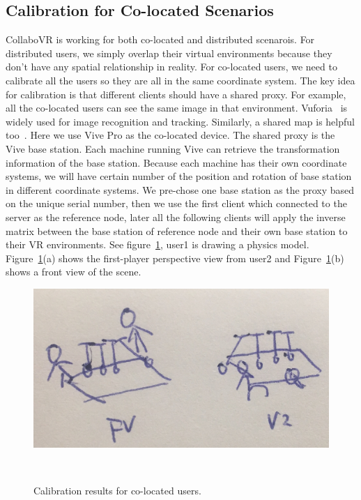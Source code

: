 \documentclass{sigchi}
\begin{document}
\subsection{Calibration for Co-located Scenarios}
CollaboVR is working for both co-located and distributed scenarois. For distributed users, we simply overlap their virtual environments because they don't have any spatial relationship in reality. For co-located users, we need to calibrate all the users so they are all in the same coordinate system. The key idea for calibration is that different clients should have a shared proxy. For example, all the co-located users can see the same image in that environment. Vuforia~\cite{Vuforia} is widely used for image recognition and tracking. Similarly, a shared map is helpful too~\cite{Hololens}. Here we use Vive Pro as the co-located device. The shared proxy is the Vive base station. Each machine running Vive can retrieve the transformation information of the base station. Because each machine has their own coordinate systems, we will have certain number of the position and rotation of base station in different coordinate systems. We pre-chose one base station as the proxy based on the unique serial number, then we use the first client which connected to the server as the reference node, later all the following clients will apply the inverse matrix between the base station of reference node and their own base station to their VR environments. See figure~\ref{fig:vivepro}, user1 is drawing a physics model. Figure~\ref{fig:vivepro}(a) shows the first-player perspective view from user2 and Figure~\ref{fig:vivepro}(b) shows a front view of the scene.

\begin{figure}[tb!]
 \centering
 \includegraphics[width=0.9\columnwidth]{vivepro.jpg}
 \caption{Calibration results for co-located users.
 }~\label{fig:vivepro}
\end{figure}
\end{document}
